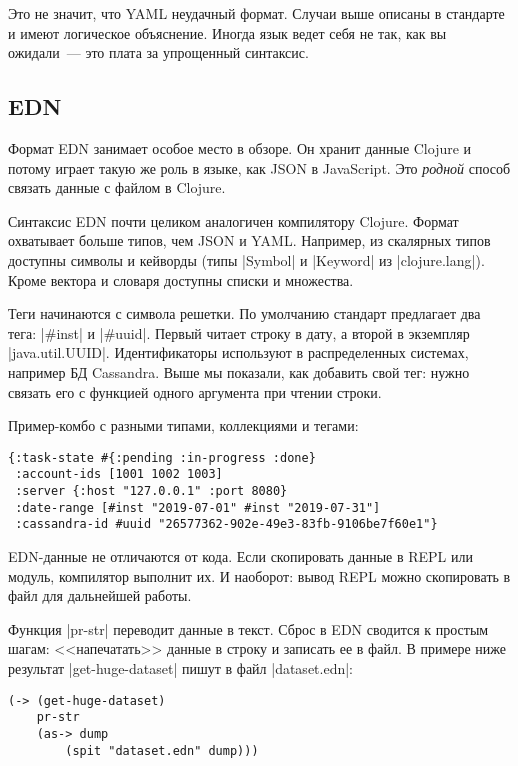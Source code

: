 Это не значит, что YAML неудачный формат. Случаи выше описаны в стандарте и
имеют логическое объяснение. Иногда язык ведет себя не так, как вы ожидали~---
это плата за упрощенный синтаксис.

\subsection{EDN}

Формат EDN занимает особое место в обзоре. Он хранит данные Clojure и потому
играет такую же роль в языке, как JSON в JavaScript. Это \emph{родной} способ
связать данные с файлом в Clojure.

Синтаксис EDN почти целиком аналогичен компилятору Clojure. Формат охватывает
больше типов, чем JSON и YAML. Например, из скалярных типов доступны символы и
кейворды (типы \spverb|Symbol| и \spverb|Keyword| из
\spverb|clojure.lang|). Кроме вектора и словаря доступны списки и множества.

Теги начинаются с символа решетки. По умолчанию стандарт предлагает два тега:
\spverb|#inst| и \spverb|#uuid|. Первый читает строку в дату, а второй в
экземпляр \spverb|java.util.UUID|. Идентификаторы используют в распределенных
системах, например БД Cassandra. Выше мы показали, как добавить свой тег: нужно
связать его с функцией одного аргумента при чтении строки.

Пример-комбо с разными типами, коллекциями и тегами:

\begin{verbatim}
{:task-state #{:pending :in-progress :done}
 :account-ids [1001 1002 1003]
 :server {:host "127.0.0.1" :port 8080}
 :date-range [#inst "2019-07-01" #inst "2019-07-31"]
 :cassandra-id #uuid "26577362-902e-49e3-83fb-9106be7f60e1"}
\end{verbatim}

EDN-данные не отличаются от кода. Если скопировать данные в REPL или модуль,
компилятор выполнит их. И наоборот: вывод REPL можно скопировать в файл для
дальнейшей работы.

Функция \spverb|pr-str| переводит данные в текст. Сброс в EDN сводится к простым
шагам: <<напечатать>> данные в строку и записать ее в файл. В примере ниже
результат \spverb|get-huge-dataset| пишут в файл \spverb|dataset.edn|:

\begin{verbatim}
(-> (get-huge-dataset)
    pr-str
    (as-> dump
        (spit "dataset.edn" dump)))
\end{verbatim}

